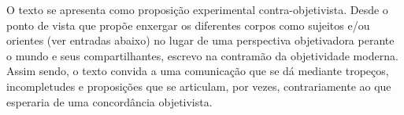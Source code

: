 O texto se apresenta como proposição experimental contra-objetivista. Desde o ponto de vista que propõe enxergar os diferentes corpos como sujeitos e/ou orientes (ver entradas abaixo) no lugar de uma perspectiva objetivadora perante o mundo e seus compartilhantes, escrevo na contramão da objetividade moderna. Assim sendo, o texto convida a uma comunicação que se dá mediante tropeços, incompletudes e proposições que se articulam, por vezes, contrariamente ao que esperaria de uma concordância objetivista.